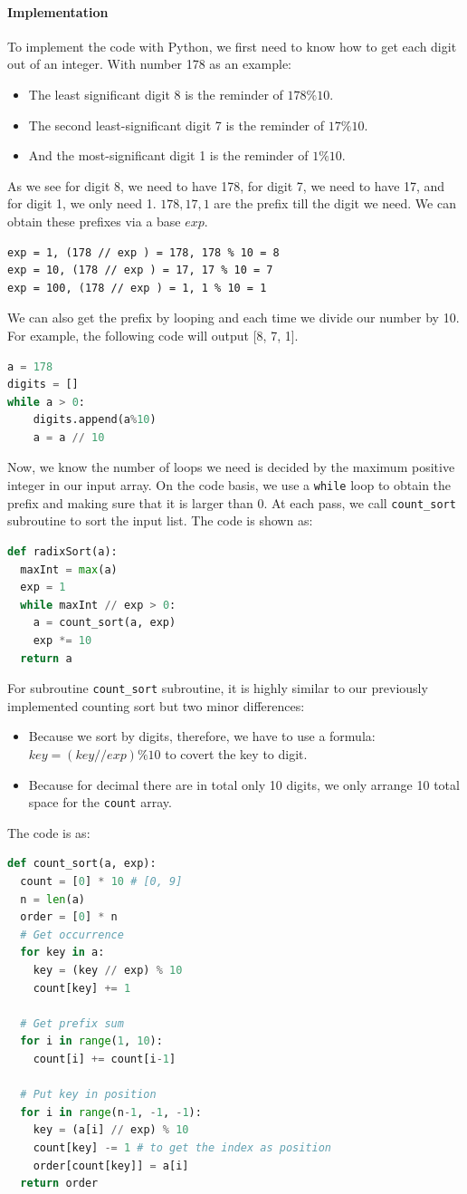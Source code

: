 \documentclass[../main.tex]{subfiles}
\begin{document}
\paragraph{Implementation}
To implement the code with Python, we first need to know how to get each digit out of an integer. With number 178 as an example:
\begin{itemize}
    \item The  least significant digit 8 is the reminder of $178\%10$. 
    \item The second least-significant digit 7 is the reminder of $17\%10$.
    \item And the most-significant digit 1 is the reminder of $1\%10$.
\end{itemize}
As we see for digit 8, we need to have 178, for digit 7, we need to have 17, and for digit 1, we only need 1. $178, 17, 1$ are the prefix till the digit we need. We can obtain these prefixes via a base $exp$.
\begin{lstlisting}[numbers=none]
exp = 1, (178 // exp ) = 178, 178 % 10 = 8
exp = 10, (178 // exp ) = 17, 17 % 10 = 7
exp = 100, (178 // exp ) = 1, 1 % 10 = 1
\end{lstlisting}
We can also get the prefix by looping and each time we divide our number by 10. For example, the following code will output [8, 7, 1]. 
\begin{lstlisting}[language = Python]
a = 178
digits = []
while a > 0:
    digits.append(a%10)
    a = a // 10
\end{lstlisting}
Now, we know the number of loops we need is decided by the maximum positive integer in our input array. On the code basis, we use a \texttt{while} loop to obtain the prefix and making sure that it is larger than 0. At each pass, we call \texttt{count\_sort} subroutine to sort the input list. The code is shown as:
\begin{lstlisting}[language=Python]
def radixSort(a):
  maxInt = max(a)
  exp = 1
  while maxInt // exp > 0:
    a = count_sort(a, exp)
    exp *= 10
  return a
\end{lstlisting}
For subroutine \texttt{count\_sort} subroutine, it is highly similar to our previously implemented counting sort but two minor differences:
\begin{itemize}
    \item Because  we sort by digits, therefore, we have to use a formula: $key = (key // exp) \% 10$ to covert the key to digit. 
    \item Because for decimal there are in total only 10 digits, we only arrange 10 total space for the \texttt{count} array. 
\end{itemize}
The code is as:
\begin{lstlisting}[language=Python]
def count_sort(a, exp):
  count = [0] * 10 # [0, 9]
  n = len(a)
  order = [0] * n
  # Get occurrence
  for key in a:
    key = (key // exp) % 10
    count[key] += 1
  
  # Get prefix sum
  for i in range(1, 10):
    count[i] += count[i-1]
    
  # Put key in position
  for i in range(n-1, -1, -1):
    key = (a[i] // exp) % 10
    count[key] -= 1 # to get the index as position
    order[count[key]] = a[i] 
  return order
\end{lstlisting}
\end{document}
